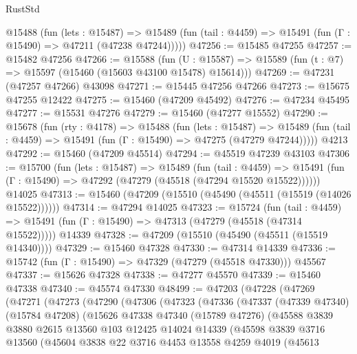 \begin{lexlean}{RustStd}
\begin{coremodule}
    @15488
      (fun (lets : @15487) =>
      @15489 (fun (tail : @4459) => @15491 (fun (Γ : @15490) => @47211 (@47238 @47244)))))
@47256 := @15485 @47255
@47257 := @15482 @47256
@47266 := @15588
    (fun (U : @15587) => @15589 (fun (t : @7) => @15597 (@15460 (@15603 @43100 @15478) @15614)))
@47269 := @47231 (@47257 @47266) @43098
@47271 := @15445 @47256 @47266
@47273 := @15675 @47255 @12422
@47275 := @15460 (@47209 @45492)
@47276 := @47234 @45495
@47277 := @15531 @47276
@47279 := @15460 (@47277 @15552)
@47290 := @15678
    (fun (rty : @4178) =>
    @15488
      (fun (lets : @15487) =>
      @15489 (fun (tail : @4459) => @15491 (fun (Γ : @15490) => @47275 (@47279 @47244)))))
    @4213
@47292 := @15460 (@47209 @45514)
@47294 := @45519 @47239 @43103
@47306 := @15700
    (fun (lets : @15487) =>
    @15489
      (fun (tail : @4459) =>
      @15491 (fun (Γ : @15490) => @47292 (@47279 (@45518 (@47294 @15520 @15522))))))
    @14025
@47313 := @15460 (@47209 (@15510 (@45490 (@45511 (@15519 (@14026 @15522))))))
@47314 := @47294 @14025
@47323 := @15724
    (fun (tail : @4459) => @15491 (fun (Γ : @15490) => @47313 (@47279 (@45518 (@47314 @15522)))))
    @14339
@47328 := @47209 (@15510 (@45490 (@45511 (@15519 @14340))))
@47329 := @15460 @47328
@47330 := @47314 @14339
@47336 := @15742 (fun (Γ : @15490) => @47329 (@47279 (@45518 @47330))) @45567
@47337 := @15626 @47328
@47338 := @47277 @45570
@47339 := @15460 @47338
@47340 := @45574 @47330
@48499 := @47203
    (@47228
      (@47269
        (@47271
          (@47273
            (@47290
              (@47306
                (@47323
                  (@47336
                    (@47337
                      (@47339 @47340)
                      (@15784 @47208)
                      (@15626
                        @47338
                        @47340
                        (@15789 @47276)
                        (@45588
                          @3839
                          @3880
                          @2615
                          @13560
                          @103
                          @12425
                          @14024
                          @14339
                          (@45598
                            @3839
                            @3716
                            @13560
                            (@45604
                              @3838
                              @22
                              @3716
                              @4453
                              @13558
                              @4259
                              @4019
                              (@45613

\end{coremodule}
\end{lexlean}
